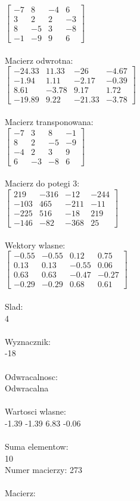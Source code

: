 \documentclass[a4paper,12pt]{article}
\begin{document}
$\begin{bmatrix} -7&8&-4&6\\3&2&2&-3\\8&-5&3&-8\\-1&-9&9&6 \end{bmatrix}$
\\
\\
Macierz odwrotna:\\

$\begin{bmatrix} -24.33&11.33&-26&-4.67\\-1.94&1.11&-2.17&-0.39\\8.61&-3.78&9.17&1.72\\-19.89&9.22&-21.33&-3.78 \end{bmatrix}$
\\
\\
Macierz transponowana:\\

$\begin{bmatrix} -7&3&8&-1\\8&2&-5&-9\\-4&2&3&9\\6&-3&-8&6 \end{bmatrix}$
\\
\\
Macierz do potegi 3:\\

$\begin{bmatrix} 219&-316&-12&-244\\-103&465&-211&-11\\-225&516&-18&219\\-146&-82&-368&25 \end{bmatrix}$
\\
\\
Wektory wlasne:\\

$\begin{bmatrix} -0.55&-0.55&0.12&0.75\\0.13&0.13&-0.55&0.06\\0.63&0.63&-0.47&-0.27\\-0.29&-0.29&0.68&0.61 \end{bmatrix}$
\\
\\
Slad:\\
4
\\
\\
Wyznacznik:\\
-18
\\
\\
Odwracalnosc:\\
Odwracalna
\\
\\
Wartosci wlasne:\\
-1.39 -1.39 6.83 -0.06
\\
\\
Suma elementow:\\
10
\\
\newpage
Numer macierzy:
273
\\
\\
Macierz:\\
\end{document}
